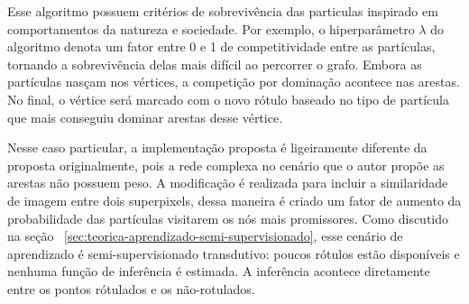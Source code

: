 Esse algoritmo possuem critérios de sobrevivência das particulas
inspirado em comportamentos da natureza e sociedade. Por exemplo, o
hiperparâmetro $ \lambda $ do algoritmo denota um fator entre 0 e 1 de
competitividade entre as partículas, tornando a sobrevivência delas
mais difícil ao percorrer o grafo. Embora as partículas nasçam nos
vértices, a competição por dominação acontece nas arestas. No final, o
vértice será marcado com o novo rótulo baseado no tipo de partícula
que mais conseguiu dominar arestas desse vértice.

Nesse caso particular, a implementação proposta é ligeiramente
diferente da proposta originalmente, pois a rede complexa no cenário
que o autor propõe as arestas não possuem peso. A modificação é
realizada para incluir a similaridade de imagem entre dois
superpixels, dessa maneira é criado um fator de aumento da
probabilidade das partículas visitarem os nós mais promissores. Como
discutido na seção
~\ref{sec:teorica-aprendizado-semi-supervisionado}, esse cenário de
aprendizado é semi-supervisionado transdutivo: poucos rótulos estão
disponíveis e nenhuma função de inferência é estimada. A inferência
acontece diretamente entre os pontos rótulados e os não-rotulados.


\begin{figure}[!h]
        \captionsetup{width=12cm}
		\centering
\end{figure}
\FloatBarrier{}

